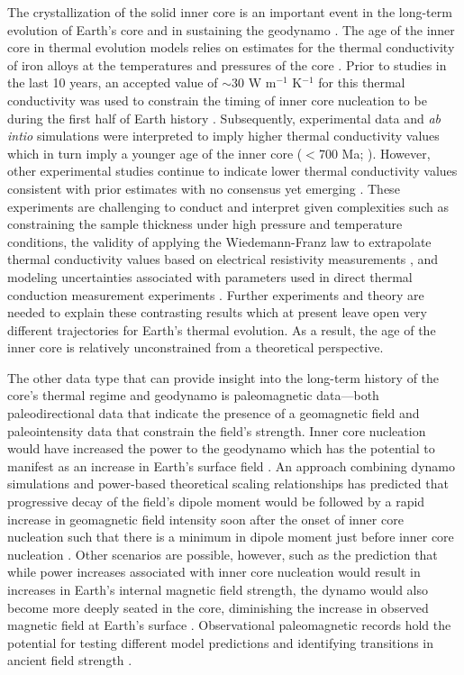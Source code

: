\documentclass[9pt,twocolumn,twoside,lineno]{pnas-new}
\begin{document}
The crystallization of the solid inner core is an important event in the long-term evolution of Earth's core and in sustaining the geodynamo \cite{Buffett2000a}. The age of the inner core in thermal evolution models relies on estimates for the thermal conductivity of iron alloys at the temperatures and pressures of the core \cite{Ohta2021a}. Prior to studies in the last 10 years, an accepted value of $\sim$30 W m$^{-1}$ K$^{-1}$ for this thermal conductivity was used to constrain the timing of inner core nucleation to be during the first half of Earth history \cite{Stacey2007a, Konopkova2016a}. Subsequently, experimental data and \textit{ab intio} simulations were interpreted to imply higher thermal conductivity values \cite{Pozzo2012a, Ohta2016a} which in turn imply a younger age of the inner core ($<$700 Ma; \citealp{Labrosse2015a}). However, other experimental studies continue to indicate lower thermal conductivity values consistent with prior estimates \cite{Konopkova2016a, Hsieh2020a} with no consensus yet emerging \cite{Williams2018a, Ohta2021a}. These experiments are challenging to conduct and interpret given complexities such as constraining the sample thickness under high pressure and temperature conditions, the validity of applying the Wiedemann-Franz law to extrapolate thermal conductivity values based on electrical resistivity measurements \cite{Ohta2016a}, and modeling uncertainties associated with parameters used in direct thermal conduction measurement experiments \cite{Konopkova2016a}. Further experiments and theory are needed to explain these contrasting results which at present leave open very different trajectories for Earth's thermal evolution. As a result, the age of the inner core is relatively unconstrained from a theoretical perspective. 

The other data type that can provide insight into the long-term history of the core's thermal regime and geodynamo is paleomagnetic data---both paleodirectional data that indicate the presence of a geomagnetic field and paleointensity data that constrain the field's strength. Inner core nucleation would have increased the power to the geodynamo which has the potential to manifest as an increase in Earth's surface field \cite{Davies2021a}. An approach combining dynamo simulations and power-based theoretical scaling relationships has predicted that progressive decay of the field's dipole moment would be followed by a rapid increase in geomagnetic field intensity soon after the onset of inner core nucleation such that there is a minimum in dipole moment just before inner core nucleation \cite{Davies2021a}. Other scenarios are possible, however, such as the prediction that while power increases associated with inner core nucleation would result in increases in Earth's internal magnetic field strength, the dynamo would also become more deeply seated in the core, diminishing the increase in observed magnetic field at Earth's surface \cite{Aubert2009a, Landeau2017a}. Observational paleomagnetic records hold the potential for testing different model predictions and identifying transitions in ancient field strength \cite{Biggin2015a, Bono2019a}.
\end{document}
